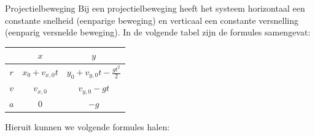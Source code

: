\begin{app}[Projectielbeweging]{Projectielbeweging}
    Bij een projectielbeweging heeft het systeem horizontaal een constante snelheid (eenparige beweging) en verticaal een constante versnelling (eenparig versnelde beweging). In de volgende tabel zijn de formules samengevat: 

    \vspace{0.3cm}

    \begin{minipage}{.66\textwidth}
        \begin{center}
            \def\arraystretch{2}
            \begin{tabular}{c|c|c}
                & $x$ & $y$ \\ \hline
                $ r $ & $ x_0 + v_{x,0}t $ & $ y_0 + v_{y,0}t - \frac{gt^2}{2} $ \\ \hline
                $ v $ & $ v_{x,0} $ & $ v_{y,0} - gt $  \\ \hline
                $ a $ & $ 0 $ & $ -g $ 
            \end{tabular}
        \end{center}

        \vspace{0.3cm}
        \hspace{-0.5cm}\noindent Hieruit kunnen we volgende formules halen: 


\end{minipage}
\end{app}
